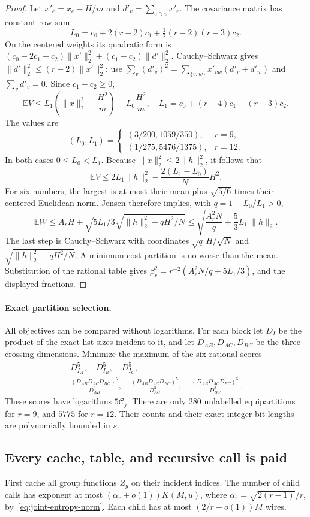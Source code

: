 \begin{proof}
Let $x'_e=x_e-H/m$ and $d'_v=\sum_{e\ni v}x'_e$.
The covariance matrix has constant row sum
\[
 L_0=c_0+2(r-2)c_1+\tfrac12(r-2)(r-3)c_2.
\]
On the centered weights its quadratic form is
$(c_0-2c_1+c_2)\|x'\|_2^2+(c_1-c_2)\|d'\|_2^2$.
Cauchy--Schwarz gives
$\|d'\|_2^2\le(r-2)\|x'\|_2^2$: use
$\sum_v(d'_v)^2=\sum_{\{v,w\}}x'_{vw}(d'_v+d'_w)$ and
$\sum_vd'_v=0$.  Since $c_1-c_2\ge0$,
\[
 \mathbb EV\le L_1\left(\|x\|_2^2-\frac{H^2}{m}\right)
                         +L_0\frac{H^2}{m},
 \quad L_1=c_0+(r-4)c_1-(r-3)c_2.
\]
The values are
\[
 (L_0,L_1)=
 \begin{cases}
 (3/200,1059/350),&r=9,\\
 (1/275,5476/1375),&r=12.
 \end{cases}
\]
In both cases $0\le L_0<L_1$.
Because $\|x\|_2^2\le2\|h\|_2^2$, it follows that
\[
 \mathbb EV\le2L_1\|h\|_2^2
                         -\frac{2(L_1-L_0)}{N}H^2.
\]
For six numbers, the largest is at most their mean plus
$\sqrt{5/6}$ times their centered Euclidean norm.  Jensen therefore
implies, with $q=1-L_0/L_1>0$,
\[
 \mathbb EW\le A_rH+
   \sqrt{5L_1/3}\sqrt{\|h\|_2^2-qH^2/N}
 \le\sqrt{\frac{A_r^2N}{q}+\frac53L_1}\,\|h\|_2.
\]
The last step is Cauchy--Schwarz with coordinates
$\sqrt q\,H/\sqrt N$ and
$\sqrt{\|h\|_2^2-qH^2/N}$.
A minimum-cost partition is no worse than the mean.  Substitution of
the rational table gives
$\beta_r^2=r^{-2}(A_r^2N/q+5L_1/3)$, and the displayed fractions.
\end{proof}

\paragraph{Exact partition selection.}
All objectives can be compared without logarithms.  For each block let
$D_I$ be the product of the exact list sizes incident to it, and let
$D_{AB},D_{AC},D_{BC}$ be the three crossing dimensions.  Minimize the
maximum of the six rational scores
\[
 \begin{gathered}
 D_{I_A}^5,\quad D_{I_B}^5,\quad D_{I_C}^5,\\[3pt]
 \frac{(D_{AB}D_{AC}D_{BC})^5}{D_{AB}^3},\quad
 \frac{(D_{AB}D_{AC}D_{BC})^5}{D_{AC}^3},\quad
 \frac{(D_{AB}D_{AC}D_{BC})^5}{D_{BC}^3}.
 \end{gathered}
\]
These scores have logarithms $5\mathcal C_j$.  There are only $280$
unlabelled equipartitions for $r=9$, and $5775$ for $r=12$.  Their counts
and their exact integer bit lengths are polynomially bounded in $s$.

\subsection{Every cache, table, and recursive call is paid}
First cache all group functions $Z_g$ on their incident indices.  The
number of child calls has exponent at most
$(\alpha_r+o(1))K(M,u)$, where
$\alpha_r=\sqrt{2(r-1)}/r$, by~\eqref{eq:joint-entropy-norm}.
Each child has at most $(2/r+o(1))M$ wires.

